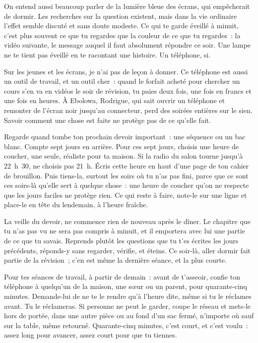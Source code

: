 \documentclass[10.5pt,twoside,openright]{book}
\newcommand{\soustitre}[1]{\par\vspace{1.1em}\noindent{\bfseries\color{accent}#1}\par\vspace{0.4em}\noindent}
\begin{document}
On entend aussi beaucoup parler de la lumière bleue des écrans, qui empêcherait de dormir. Les recherches sur la question existent, mais dans la vie ordinaire l’effet semble discuté et sans doute modeste. Ce qui te garde éveillé à minuit, c’est plus souvent ce que tu regardes que la couleur de ce que tu regardes : la vidéo suivante, le message auquel il faut absolument répondre ce soir. Une lampe ne te tient pas éveillé en te racontant une histoire. Un téléphone, si.

Sur les jeunes et les écrans, je n’ai pas de leçon à donner. Ce téléphone est aussi un outil de travail, et un outil cher : quand le forfait acheté pour chercher un cours s’en va en vidéos le soir de révision, tu paies deux fois, une fois en francs et une fois en heures. À Ebolowa, Rodrigue, qui sait ouvrir un téléphone et remonter de l’écran noir jusqu’au connecteur, perd des soirées entières sur le sien. Savoir comment une chose est faite ne protège pas de ce qu’elle fait.

\soustitre{Ce soir, essaie ceci}

Regarde quand tombe ton prochain devoir important : une séquence ou un bac blanc. Compte sept jours en arrière. Pour ces sept jours, choisis une heure de coucher, une seule, réaliste pour ta maison. Si la radio du salon tourne jusqu’à 22 h 30, ne choisis pas 21 h. Écris cette heure en haut d’une page de ton cahier de brouillon. Puis tiens-la, surtout les soirs où tu n’as pas fini, parce que ce sont ces soirs-là qu’elle sert à quelque chose : une heure de coucher qu’on ne respecte que les jours faciles ne protège rien. Ce qui reste à faire, note-le sur une ligne et place-le en tête du lendemain, à l’heure fraîche.

La veille du devoir, ne commence rien de nouveau après le dîner. Le chapitre que tu n’as pas vu ne sera pas compris à minuit, et il emportera avec lui une partie de ce que tu savais. Reprends plutôt les questions que tu t’es écrites les jours précédents, réponds-y sans regarder, vérifie, et éteins. Ce soir-là, aller dormir fait partie de la révision ; c’en est même la dernière séance, et la plus courte.

Pour tes séances de travail, à partir de demain : avant de t’asseoir, confie ton téléphone à quelqu’un de la maison, une sœur ou un parent, pour quarante-cinq minutes. Demande-lui de ne te le rendre qu’à l’heure dite, même si tu le réclames avant. Tu le réclameras. Si personne ne peut le garder, coupe le réseau et mets-le hors de portée, dans une autre pièce ou au fond d’un sac fermé, n’importe où sauf sur la table, même retourné. Quarante-cinq minutes, c’est court, et c’est voulu : assez long pour avancer, assez court pour que tu tiennes.
\end{document}
